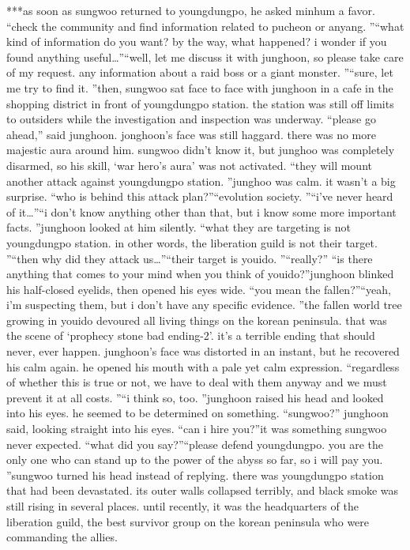 ***as soon as sungwoo returned to youngdungpo, he asked minhum a favor.
“check the community and find information related to pucheon or anyang.
”“what kind of information do you want? by the way, what happened? i wonder if you found anything useful…”“well, let me discuss it with junghoon, so please take care of my request.
 any information about a raid boss or a giant monster.
”“sure, let me try to find it.
”then, sungwoo sat face to face with junghoon in a cafe in the shopping district in front of youngdungpo station.
 the station was still off limits to outsiders while the investigation and inspection was underway.
“please go ahead,” said junghoon.
jonghoon’s face was still haggard.
 there was no more majestic aura around him.
 sungwoo didn’t know it, but junghoo was completely disarmed, so his skill, ‘war hero’s aura’ was not activated.
“they will mount another attack against youngdungpo station.
”junghoo was calm.
 it wasn’t a big surprise.
“who is behind this attack plan?”“evolution society.
”“i’ve never heard of it…”“i don’t know anything other than that, but i know some more important facts.
”junghoon looked at him silently.
“what they are targeting is not youngdungpo station.
 in other words, the liberation guild is not their target.
”“then why did they attack us…”“their target is youido.
”“really?”
“is there anything that comes to your mind when you think of youido?”junghoon blinked his half-closed eyelids, then opened his eyes wide.
“you mean the fallen?”“yeah, i’m suspecting them, but i don’t have any specific evidence.
”the fallen world tree growing in youido devoured all living things on the korean peninsula.
that was the scene of ‘prophecy stone bad ending-2’.
 it’s a terrible ending that should never, ever happen.
junghoon’s face was distorted in an instant, but he recovered his calm again.
he opened his mouth with a pale yet calm expression.
“regardless of whether this is true or not, we have to deal with them anyway and we must prevent it at all costs.
”“i think so, too.
”junghoon raised his head and looked into his eyes.
he seemed to be determined on something.
“sungwoo?” junghoon said, looking straight into his eyes.
 “can i hire you?”it was something sungwoo never expected.
“what did you say?”“please defend youngdungpo.
 you are the only one who can stand up to the power of the abyss so far, so i will pay you.
”sungwoo turned his head instead of replying.
 there was youngdungpo station that had been devastated.
 its outer walls collapsed terribly, and black smoke was still rising in several places.
until recently, it was the headquarters of the liberation guild, the best survivor group on the korean peninsula who were commanding the allies.
